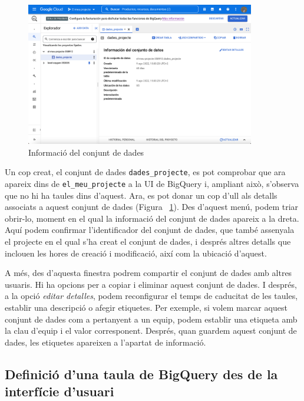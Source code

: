 \documentclass[12pt,longbibliography]{article}
\theoremstyle{definition}
\theoremstyle{remark}
\begin{document}
\vspace{2mm}
\begin{figure}[h!]
\begin{center}
\includegraphics[width=10cm]{bq5}
\end{center}
\caption{Informació del conjunt de dades}
\label{fig:bq5}
\end{figure}
\vspace{2mm}

Un cop creat, el conjunt de dades \verb|dades_projecte|, es pot comprobar que ara apareix dins de \verb|el_meu_projecte| a la UI de BigQuery i, ampliant això, s'observa que no hi ha taules dins d'aquest. Ara, es pot donar un cop d'ull als detalls associats a aquest conjunt de dades (Figura ~\ref{fig:bq5}). Des d'aquest menú, podem triar obrir-lo, moment en el qual la informació del conjunt de dades apareix a la dreta. Aquí podem confirmar l'identificador del conjunt de dades, que també assenyala el projecte en el qual s'ha creat el conjunt de dades, i després altres detalls que inclouen les hores de creació i modificació, així com la ubicació d'aquest.

\vspace{2mm}

A més, des d'aquesta finestra podrem compartir el conjunt de dades amb altres usuaris. Hi ha opcions per a copiar i eliminar aquest conjunt de dades. I després, a la opció \textit{editar detalles}, podem reconfigurar el temps de caducitat de les taules, establir una descripció o afegir etiquetes. Per exemple, si volem marcar aquest conjunt de dades com a pertanyent a un equip, podem establir una etiqueta amb la clau d'equip i el valor corresponent. Després, quan guardem aquest conjunt de dades, les etiquetes apareixen a l'apartat de informació.

\subsection{Definició d'una taula de BigQuery des de la interfície d'usuari}
\end{document}
